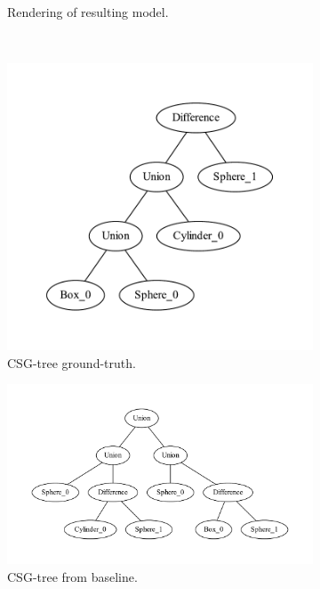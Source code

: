 \begin{figure}
\begin{subfigure}[b]{0.40\linewidth}
		\caption{Rendering of resulting model.}
	\end{subfigure}	 
	\\	
	\begin{subfigure}[b]{0.22\linewidth}
		\centering
		\includegraphics[width=\textwidth]{figures/tree_m1_gt.pdf}
		\caption{\ac{CSG}-tree ground-truth.}
	\end{subfigure}	 
	\begin{subfigure}[b]{0.38\linewidth}
		\centering
		\includegraphics[width=\textwidth]{figures/tree_m1_ga.pdf}
		\caption{\ac{CSG}-tree from baseline.}
	\end{subfigure}	 
	\begin{subfigure}[b]{0.38\linewidth}

\end{subfigure}
\end{figure}
